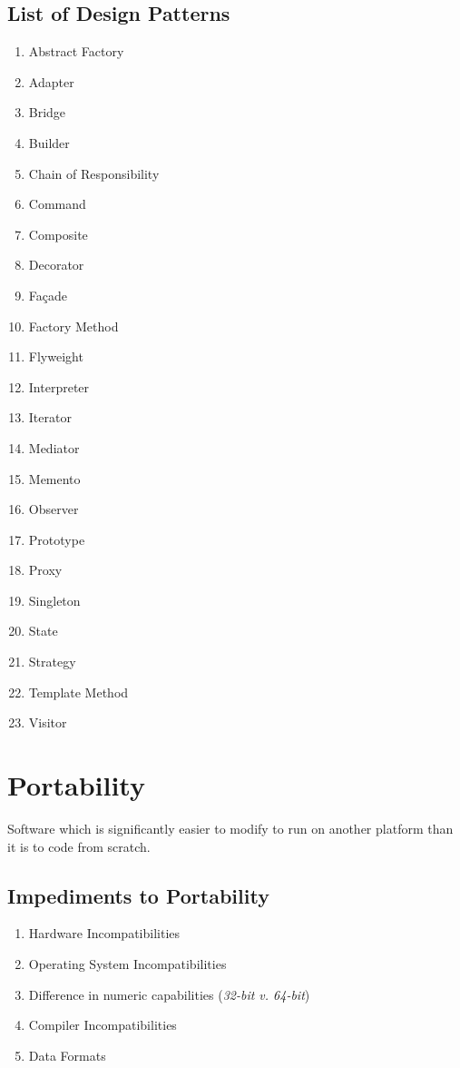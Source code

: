 \documentclass{report}
\begin{document}
			\subsection{List of Design Patterns}
				\begin{enumerate}
					\item Abstract Factory
					\item Adapter
					\item Bridge
					\item Builder
					\item Chain of Responsibility
					\item Command
					\item Composite
					\item Decorator
					\item Façade
					\item Factory Method
					\item Flyweight
					\item Interpreter
					\item Iterator
					\item Mediator
					\item Memento
					\item Observer
					\item Prototype
					\item Proxy
					\item Singleton
					\item State
					\item Strategy
					\item Template Method
					\item Visitor
				\end{enumerate}
		\section{Portability}
			Software which is significantly easier to modify to run on another platform than it is to code from scratch.
			\subsection{Impediments to Portability}
				\begin{enumerate}
					\item Hardware Incompatibilities
					\item Operating System Incompatibilities
					\item Difference in numeric capabilities (\textit{32-bit v. 64-bit})
					\item Compiler Incompatibilities
					\item Data Formats
				\end{enumerate}
\end{document}
